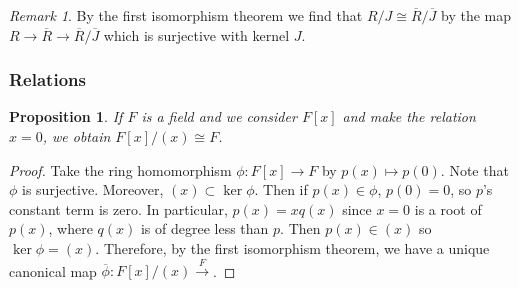 \documentclass[12pt]{article}
\newtheorem{prop}[thm]{Proposition}
\theoremstyle{definition}
\theoremstyle{remark}
\newtheorem{rmk}[thm]{Remark}
\numberwithin{equation}{section}
\begin{document}
\vspace{15pt}

\begin{rmk}
        By the first isomorphism theorem we find that $R/J \cong \overline{R}/\overline{J}$ by the map $R\rightarrow \overline{R} \rightarrow \overline{R}/\overline{J}$ which is surjective with kernel $J$.
\end{rmk}


\vspace{15pt}


\subsubsection{Relations}

\begin{prop}
        If $F$ is a field and we consider $F[x]$ and make the relation $x = 0$, we obtain $F[x]/(x) \cong F$.
\end{prop}
\begin{proof}
        Take the ring homomorphism $\phi:F[x] \rightarrow F$ by $p(x) \mapsto p(0)$. Note that $\phi$ is surjective. Moreover, $(x) \subset \ker \phi$. Then if $p(x) \in \phi$, $p(0) = 0$, so $p$'s constant term is zero. In particular, $p(x) = xq(x)$ since $x = 0$ is a root of $p(x)$, where $q(x)$ is of degree less than $p$. Then $p(x) \in (x)$ so $\ker \phi = (x)$. Therefore, by the first isomorphism theorem, we have a unique canonical map $\overline{\phi}:F[x]/(x) \xrightarrow F$.
\end{proof}





\vspace{15pt}





\end{document}
